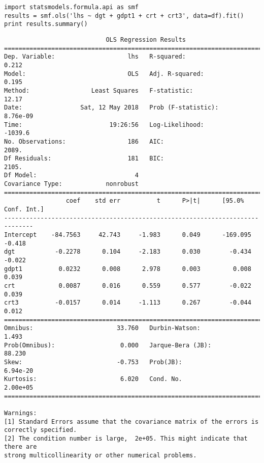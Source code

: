 \documentclass[12pt,fleqn]{article}\usepackage{../../common}
\begin{document}
\begin{verbatim}
import statsmodels.formula.api as smf
results = smf.ols('lhs ~ dgt + gdpt1 + crt + crt3', data=df).fit()
print results.summary()
\end{verbatim}

\begin{verbatim}
                            OLS Regression Results                            
==============================================================================
Dep. Variable:                    lhs   R-squared:                       0.212
Model:                            OLS   Adj. R-squared:                  0.195
Method:                 Least Squares   F-statistic:                     12.17
Date:                Sat, 12 May 2018   Prob (F-statistic):           8.76e-09
Time:                        19:26:56   Log-Likelihood:                -1039.6
No. Observations:                 186   AIC:                             2089.
Df Residuals:                     181   BIC:                             2105.
Df Model:                           4                                         
Covariance Type:            nonrobust                                         
==============================================================================
                 coef    std err          t      P>|t|      [95.0% Conf. Int.]
------------------------------------------------------------------------------
Intercept    -84.7563     42.743     -1.983      0.049      -169.095    -0.418
dgt           -0.2278      0.104     -2.183      0.030        -0.434    -0.022
gdpt1          0.0232      0.008      2.978      0.003         0.008     0.039
crt            0.0087      0.016      0.559      0.577        -0.022     0.039
crt3          -0.0157      0.014     -1.113      0.267        -0.044     0.012
==============================================================================
Omnibus:                       33.760   Durbin-Watson:                   1.493
Prob(Omnibus):                  0.000   Jarque-Bera (JB):               88.230
Skew:                          -0.753   Prob(JB):                     6.94e-20
Kurtosis:                       6.020   Cond. No.                     2.00e+05
==============================================================================

Warnings:
[1] Standard Errors assume that the covariance matrix of the errors is correctly specified.
[2] The condition number is large,  2e+05. This might indicate that there are
strong multicollinearity or other numerical problems.
\end{verbatim}
\end{document}
